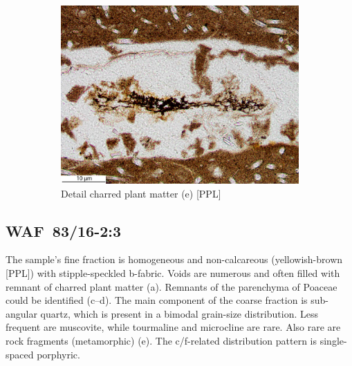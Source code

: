 \documentclass[a4paper]{article}
\begin{document}
\begin{figure}[H]
\begin{subfigure}[t]{.32\textwidth}
		\includegraphics[width=\textwidth]{ThinSections/47-2b_20x_PPL.jpg}
		\caption{Detail charred plant matter (e) [PPL]}
	\end{subfigure}
	\caption{}
	\label{fig:47_waf}
\end{figure}

\newpage\subsection{WAF~83/16-2:3 \citep[waf\#48; Fig.~\ref{fig:wafmon.pottery}.6; \ref{fig:thinsections}K--L; Bekongo style;][503 Pl.~69.6]{Wotzka.1995}}

\begin{multicols}{2}
\noindent The sample's fine fraction is homogeneous and non-calcareous (yellowish-brown [PPL]) with stipple-speckled b-fabric. Voids are numerous and often filled with remnant of charred plant matter (a). Remnants of the parenchyma of Poaceae could be identified (c--d). The main component of the coarse fraction is sub-angular quartz, which is present in a bimodal grain-size distribution. Less frequent are muscovite, while tourmaline and microcline are rare. Also rare are rock fragments (metamorphic) (e). The c/f-related distribution pattern is single-spaced porphyric.
\end{multicols}
\end{document}
